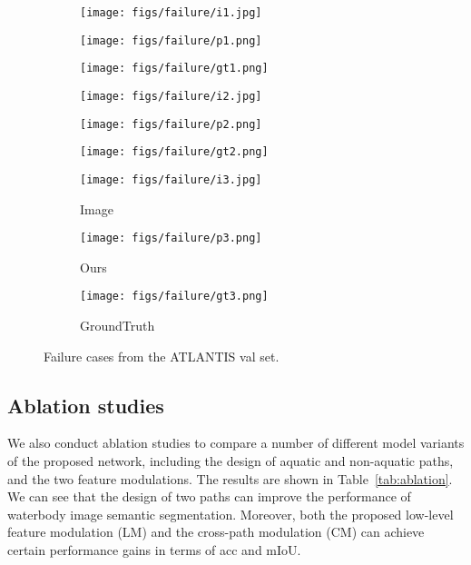 \documentclass{article}
\begin{document}
\begin{figure}[h]
    \begin{subfigure}[b]{0.328\linewidth}
        \texttt{[image: figs/failure/i1.jpg]}
    \end{subfigure}
    \begin{subfigure}[b]{0.328\linewidth}
        \texttt{[image: figs/failure/p1.png]}
    \end{subfigure}
    \begin{subfigure}[b]{0.328\linewidth}
        \texttt{[image: figs/failure/gt1.png]}
    \end{subfigure}
    \begin{subfigure}[b]{0.328\linewidth}
        \texttt{[image: figs/failure/i2.jpg]}
    \end{subfigure}
    \begin{subfigure}[b]{0.328\linewidth}
        \texttt{[image: figs/failure/p2.png]}
    \end{subfigure}
    \begin{subfigure}[b]{0.328\linewidth}
        \texttt{[image: figs/failure/gt2.png]}
    \end{subfigure}
    \begin{subfigure}[b]{0.328\linewidth}
        \texttt{[image: figs/failure/i3.jpg]}
        \vspace{-15pt} \caption*{Image}
    \end{subfigure}
    \begin{subfigure}[b]{0.328\linewidth}
        \texttt{[image: figs/failure/p3.png]}
        \vspace{-15pt} \caption*{Ours}
    \end{subfigure}
    \begin{subfigure}[b]{0.328\linewidth}
        \texttt{[image: figs/failure/gt3.png]}
        \vspace{-15pt} \caption*{GroundTruth}
    \end{subfigure}
    \caption{Failure cases from the ATLANTIS val set.}
    \label{fig:fail}
\end{figure}

\subsection{Ablation studies}
We also conduct ablation studies to compare a number of different model variants of the proposed network, including the design of aquatic and non-aquatic paths, and the two feature modulations. The results are shown in Table~\ref{tab:ablation}. We can see that the design of two paths can improve the performance of waterbody image semantic segmentation. Moreover, both the proposed low-level feature modulation (LM) and the cross-path modulation (CM) can achieve certain performance gains in terms of acc and mIoU.
\end{document}
